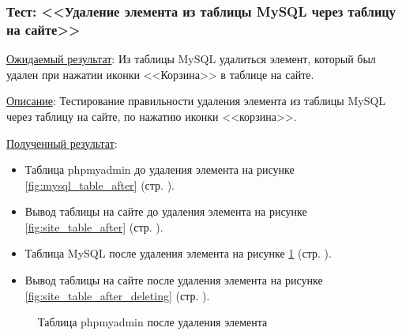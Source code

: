 \newpage

\subsubsection*{\textbf{Тест}: <<Удаление элемента из таблицы MySQL через таблицу на сайте>>}

\underline{Ожидаемый результат}:
Из таблицы MySQL удалиться элемент, который был удален при нажатии иконки <<Корзина>> в таблице на сайте.

\underline{Описание}:
Тестирование правильности удаления элемента из таблицы MySQL через таблицу на сайте, по нажатию иконки <<корзина>>.

\underline{Полученный результат}:

\begin{itemize}
    \item Таблица phpmyadmin до удаления элемента
    на рисунке \ref{fig:mysql_table_after}
    (стр. \pageref{fig:mysql_table_after}).

    \item Вывод таблицы на сайте до удаления элемента
    на рисунке \ref{fig:site_table_after}
    (стр. \pageref{fig:site_table_after}).

    \item Таблица MySQL после удаления элемента
    на рисунке \ref{fig:mysql_table_after_deleting}
    (стр. \pageref{fig:mysql_table_after_deleting}).

    \item Вывод таблицы на сайте после удаления элемента
    на рисунке \ref{fig:site_table_after_deleting}
    (стр. \pageref{fig:site_table_after_deleting}).
\end{itemize}

\begin{figure}[p]
    \caption{Таблица phpmyadmin после удаления элемента}
    \label{fig:mysql_table_after_deleting}
\end{figure}

